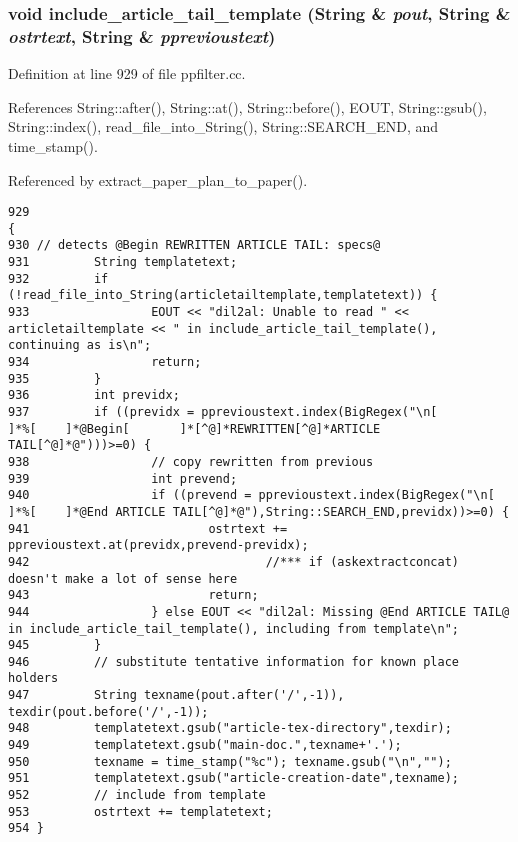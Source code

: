 \subsubsection{\setlength{\rightskip}{0pt plus 5cm}void include\_\-article\_\-tail\_\-template ({\bf String} \& {\em pout}, {\bf String} \& {\em ostrtext}, {\bf String} \& {\em pprevioustext})}\label{ppfilter_8cc_a23}




Definition at line 929 of file ppfilter.cc.

References String::after(), String::at(), String::before(), EOUT, String::gsub(), String::index(), read\_\-file\_\-into\_\-String(), String::SEARCH\_\-END, and time\_\-stamp().

Referenced by extract\_\-paper\_\-plan\_\-to\_\-paper().



\footnotesize\begin{verbatim}929                                                                                              {
930 // detects @Begin REWRITTEN ARTICLE TAIL: specs@
931         String templatetext;
932         if (!read_file_into_String(articletailtemplate,templatetext)) {
933                 EOUT << "dil2al: Unable to read " << articletailtemplate << " in include_article_tail_template(), continuing as is\n";
934                 return;
935         }
936         int previdx;
937         if ((previdx = pprevioustext.index(BigRegex("\n[        ]*%[    ]*@Begin[       ]*[^@]*REWRITTEN[^@]*ARTICLE TAIL[^@]*@")))>=0) {
938                 // copy rewritten from previous
939                 int prevend;
940                 if ((prevend = pprevioustext.index(BigRegex("\n[        ]*%[    ]*@End ARTICLE TAIL[^@]*@"),String::SEARCH_END,previdx))>=0) {
941                         ostrtext += pprevioustext.at(previdx,prevend-previdx);
942                                 //*** if (askextractconcat) doesn't make a lot of sense here
943                         return;
944                 } else EOUT << "dil2al: Missing @End ARTICLE TAIL@ in include_article_tail_template(), including from template\n";
945         }
946         // substitute tentative information for known place holders
947         String texname(pout.after('/',-1)), texdir(pout.before('/',-1));
948         templatetext.gsub("article-tex-directory",texdir);
949         templatetext.gsub("main-doc.",texname+'.');
950         texname = time_stamp("%c"); texname.gsub("\n","");
951         templatetext.gsub("article-creation-date",texname);
952         // include from template
953         ostrtext += templatetext;
954 }
\end{verbatim}\normalsize 
{}
